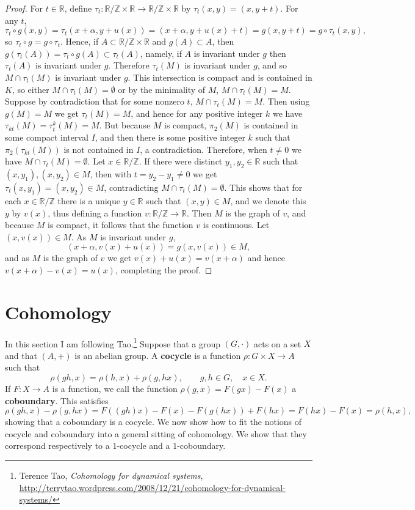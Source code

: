 \documentclass{article}
\theoremstyle{definition}
\begin{document}
\begin{proof}
 For $t \in \mathbb{R}$, define $\tau_t:\mathbb{R} / \mathbb{Z} \times \mathbb{R} \to \mathbb{R} / \mathbb{Z} \times \mathbb{R}$
 by $\tau_t(x,y)=(x,y+t)$. For any $t$,
 \[
 \tau_t \circ g(x,y) = \tau_t  (x+\alpha,y+u(x)) = (x+\alpha,y+u(x)+t) = g(x,y+t) = g \circ \tau_t (x,y),
 \]
 so $\tau_t \circ g = g \circ \tau_t$. Hence, if $A \subset \mathbb{R} / \mathbb{Z} \times \mathbb{R}$
and $g(A) \subset A$, then $g(\tau_t (A)) = \tau_t \circ g(A) \subset \tau_t (A)$, namely, if $A$ is invariant under $g$ then $\tau_t(A)$ is invariant under $g$.
Therefore $\tau_t(M)$ is invariant under $g$, and so $M \cap \tau_t(M)$ is invariant under $g$. 
This intersection is compact and is contained in $K$, so either $M \cap \tau_t(M) = \emptyset$ or by the minimality of $M$, $M \cap \tau_t(M)=M$.
Suppose by contradiction that for some nonzero $t$, $M \cap \tau_t(M)=M$. Then using $g(M)=M$ we get 
 $\tau_t(M)=M$, and hence for any positive integer $k$ we have 
 $\tau_{kt}(M)=\tau_t^k(M) = M$. But because $M$ is compact, $\pi_2(M)$ is contained in some compact interval $I$, and then there is some 
 positive integer $k$ such that $\pi_2(\tau_{kt}(M))$ is not contained in $I$, a contradiction. Therefore, when $t \neq 0$ we have $M \cap \tau_t(M) = \emptyset$. 
 Let $x \in \mathbb{R} / \mathbb{Z}$. If there were 
  distinct $y_1,y_2 \in \mathbb{R}$ such that
 $(x,y_1),(x,y_2) \in M$, then with $t=y_2-y_1 \neq 0$ we get $\tau_t(x,y_1)=(x,y_2) \in M$, contradicting 
 $M \cap \tau_t(M) = \emptyset$. This shows that for each $x \in \mathbb{R} / \mathbb{Z}$ there is a unique 
 $y \in \mathbb{R}$ such that
 $(x,y) \in M$, and we denote this $y$ by $v(x)$, thus defining a function $v:\mathbb{R} / \mathbb{Z} \to \mathbb{R}$. 
 Then $M$ is the graph of $v$, and because $M$ is compact, it follows that the function $v$ is continuous. 
Let $(x,v(x)) \in M$. As $M$ is invariant under $g$,
\[
 (x+\alpha,v(x)+u(x)) = g(x,v(x)) \in M,
\]
and as $M$ is the graph of $v$ we get $v(x)+u(x)=v(x+\alpha)$ and hence
$v(x+\alpha)-v(x)=u(x)$, completing the proof.
\end{proof}



\section{Cohomology}
In this section I am following Tao.\footnote{Terence Tao, {\em Cohomology for dynamical systems}, \url{http://terrytao.wordpress.com/2008/12/21/cohomology-for-dynamical-systems/}}
Suppose that a group $(G,\cdot)$ acts on a set $X$ and that $(A,+)$ is an abelian group. A \textbf{cocycle} is a function
$\rho:G \times X \to A$ such that 
\begin{equation}
\rho(gh,x)=\rho(h,x)+\rho(g,hx), \qquad g,h \in G, \quad x \in X.
\label{cocycle}
\end{equation}
If $F:X \to A$ is a function, we call the function $\rho(g,x)=F(gx)-F(x)$ a \textbf{coboundary}. This satisfies
\[
\rho(gh,x)-\rho(g,hx)=F((gh)x)-F(x)-F(g(hx))+F(hx)=F(hx)-F(x)=\rho(h,x),
\]
showing that a coboundary is a cocycle.
We now show how to fit the notions of cocycle and coboundary into a general sitting of cohomology. We show that
they correspond respectively to a $1$-cocycle and a $1$-coboundary. 
\end{document}
